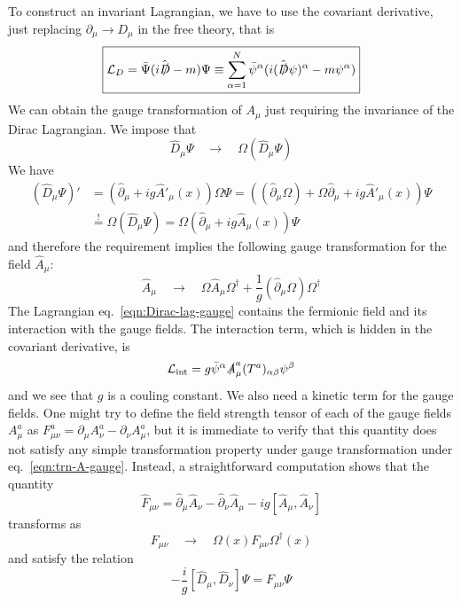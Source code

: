 \documentclass[TheoreticalPhy_ModB.tex]{subfiles}
\begin{document}
To construct an invariant Lagrangian, we have to use the covariant derivative, just replacing $\partial_\mu\to D_\mu$ in the free theory, that is 
\begin{equation}\label{eqn:Dirac-lag-gauge}\boxed{
\mathcal L_D=\bar\Psi(i\hat{\slashed D}-m)\Psi\equiv\sum_{\alpha=1}^N\bar\psi^\alpha(i(\hat{\slashed D}\psi)^\alpha-m\psi^\alpha)
}\end{equation}
We can obtain the gauge transformation of $A_\mu$ just requiring the invariance of the Dirac Lagrangian. We impose that 
\[\hat D_\mu\Psi\quad\to\quad\Omega(\hat D_\mu\Psi)\]
We have
\begin{align*}
(\hat D_\mu\Psi)'&=(\hat \partial_\mu+ig\hat A'_\mu(x))\Omega\Psi=((\hat \partial_\mu\Omega)+\Omega\hat \partial_\mu+ig\hat A'_\mu(x))\Psi\\
&\overset{!}{=}\Omega(\hat D_\mu\Psi)=\Omega(\hat \partial_\mu+ig\hat A_\mu(x))\Psi
\end{align*}
and therefore the requirement implies the following gauge transformation for the field $\hat A_\mu$:
\begin{equation}\label{eqn:trn-A-gauge}\boxed{
\hat A_\mu\quad\to\quad\Omega\hat A_\mu\Omega^\dagger+\frac1g(\hat \partial_\mu\Omega)\Omega^\dagger
}\end{equation}
The Lagrangian eq.~\eqref{eqn:Dirac-lag-gauge} contains the fermionic field and its interaction with the gauge fields. The interaction term, which is hidden in the covariant derivative, is
\[\mathcal L_{\text{int}}=g\bar\psi^\alpha \slashed A_\mu^a(T^a)_{\alpha\beta}\psi^\beta\]
and we see that $g$ is a couling constant. We also need a kinetic term for the gauge fields. One might try to define the field strength tensor of each of the gauge fields $A^a_\mu$ as $F_{\mu\nu}^a=\partial_\mu A^a_\nu-\partial_\nu A^a_\mu$, but it is immediate to verify that this quantity does not satisfy any simple transformation property under gauge transformation under eq.~\eqref{eqn:trn-A-gauge}. Instead, a straightforward computation shows that the quantity
\begin{equation}\label{eqn:dfn-F-gauge}\boxed{
\hat F_{\mu\nu}=\hat \partial_\mu \hat A_\nu-\hat \partial_\nu \hat A_\mu-ig[\hat A_\mu,\hat A_\nu]
}\end{equation}
transforms as
\begin{equation}\label{eqn:F-tensor-matr-transform}
F_{\mu\nu}\quad\to\quad\Omega(x)F_{\mu\nu}\Omega^\dagger(x)
\end{equation}
and satisfy the relation
\[-\frac ig[\hat D_\mu,\hat D_\nu]\Psi=F_{\mu\nu}\Psi\]
\end{document}
